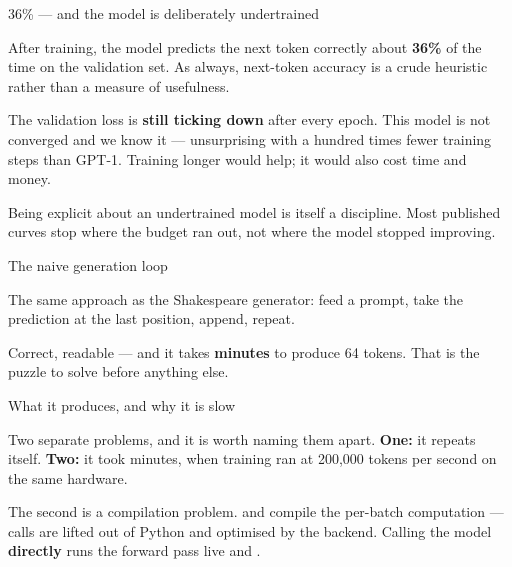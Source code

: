 \documentclass[aspectratio=169,11pt,t]{beamer}
\begin{document}
\begin{frame}[shrink=25]{36\% --- and the model is deliberately undertrained}
{\fontsize{9.4}{12.6}\selectfont\color{fg2}After training, the model predicts the next token correctly about \textbf{36\%} of the time on the validation set. As always, next-token accuracy is a crude heuristic rather than a measure of usefulness.\par}\vskip 4pt
\begin{iband}[amber]
The validation loss is \textbf{still ticking down} after every epoch. This model is not converged and we know it --- unsurprising with a hundred times fewer training steps than GPT-1. Training longer would help; it would also cost time and money.
\end{iband}
{\fontsize{9.4}{12.6}\selectfont\color{fg2}Being explicit about an undertrained model is itself a discipline. Most published curves stop where the budget ran out, not where the model stopped improving.\par}\vskip 4pt
\end{frame}


\begin{frame}[shrink=25]{The naive generation loop}
{\fontsize{9.4}{12.6}\selectfont\color{fg2}The same approach as the Shakespeare generator: feed a prompt, take the prediction at the last position, append, repeat.\par}\vskip 4pt
{\fontsize{9.4}{12.6}\selectfont\color{fg2}Correct, readable --- and it takes \textbf{minutes} to produce 64 tokens. That is the puzzle to solve before anything else.\par}\vskip 4pt
\end{frame}

\begin{frame}[shrink=25]{What it produces, and why it is slow}
{\fontsize{9.4}{12.6}\selectfont\color{fg2}Two separate problems, and it is worth naming them apart. \textbf{One:} it repeats itself. \textbf{Two:} it took minutes, when training ran at 200,000 tokens per second on the same hardware.\par}\vskip 4pt
{\fontsize{9.4}{12.6}\selectfont\color{fg2}The second is a compilation problem.  and  compile the per-batch computation ---  calls are lifted out of Python and optimised by the backend. Calling the model \textbf{directly} runs the forward pass live and .\par}\vskip 4pt
\end{frame}
\end{document}
